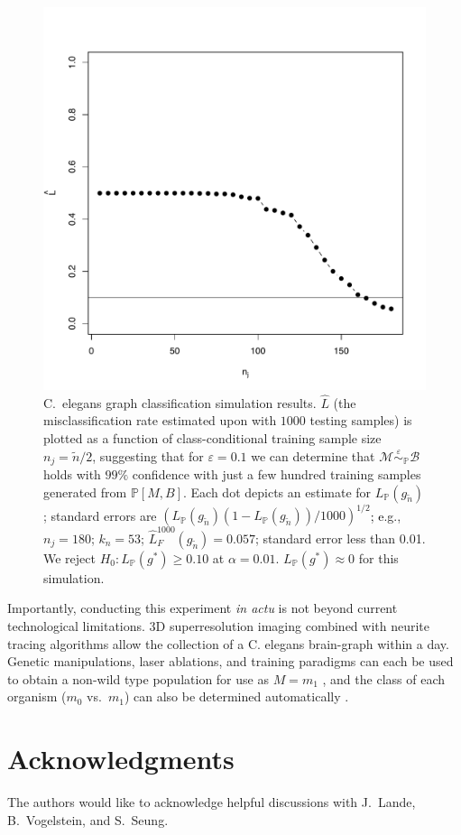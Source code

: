\documentclass{article}
\newcommand{\mB}{\mathcal{B}}
\newcommand{\mM}{\mathcal{M}}
\newcommand{\PP}{\mathbb{P}}           %
\providecommand{\mt}[1]{\widetilde{#1}}
\newcommand{\hL}{\widehat{L}}
\newcommand{\MeB}{\mM \overset{\varepsilon}{{\sim}}_{\PP} \mB}
\providecommand{\tr}[1]{\textcolor{black}{#1}}
\begin{document}
\begin{figure}[!ht]
\centering \includegraphics[width=.5\linewidth]{Lhatplot}
\caption{C.~elegans graph classification simulation results.  $\hL$  (the misclassification rate estimated upon with $1000$ testing samples) %
is plotted as a function of class-conditional training sample size $n_j=\mt{n}/2$, suggesting that for $\varepsilon=0.1$ we can determine that $\MeB$ holds with $99\%$ confidence with just a few hundred training samples generated from $\PP[M,B]$. Each dot depicts an estimate for $L_{\PP}(g_{\mt{n}})$; standard errors are $(L_{\PP}(g_{\mt{n}})(1-L_{\PP}(g_{\mt{n}}))/1000)^{1/2}$\tr{; e}.g., $n_j = 180$; $k_n = 53$; $\hL^{1000}_{F}(g_{\mt{n}}) = 0.057$; standard error less than 0.01. We reject $H_0: L_{\PP}(g^*) \geq 0.10$ at $\alpha=0.01$. $L_{\PP}(g^*) \approx 0$ for this simulation.
}
\label{fig1}
\end{figure}

Importantly, conducting this experiment {\it in actu} is not beyond current technological limitations. 3D superresolution imaging \cite{VaziriShank08} combined with neurite tracing algorithms \cite{HelmstaedterDenk08,Mishchenko09,LuLichtman09} allow the collection of a C. elegans brain-graph within a day. Genetic manipulations, laser ablations, and training paradigms can each be used to obtain a non-wild type population for use as $M=m_1$ \cite{deBonoMaricq05}, and the class of each organism ($m_0$ vs.~$m_1$) can also be determined automatically \cite{BuckinghamSattelle08}.

\clearpage




\section*{Acknowledgments}

The authors would like to acknowledge helpful discussions with J.~Lande, B.~Vogelstein, and S.~Seung. 


% 


\end{document}
